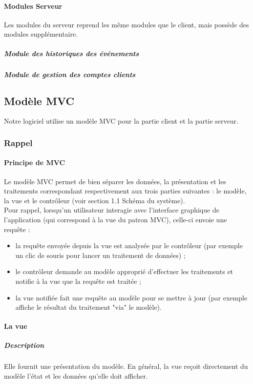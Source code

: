 \documentclass[10pt,a4paper]{report}
\begin{document}
				
			\paragraph{Modules Serveur}
				Les modules du serveur reprend les même modules que le client, mais possède des modules supplémentaire.
				
				\subparagraph{Module des historiques des événements}
	
	
				\subparagraph{Module de gestion des comptes clients}

				
	\subsection{Modèle MVC}
		Notre logiciel utilise un modèle MVC pour la partie client et la partie serveur.
		\subsubsection{Rappel}
			
			\paragraph{Principe de MVC}
			\begin{flushleft}

			Le modèle MVC permet de bien séparer les données, la présentation et les traitements correspondant respectivement aux trois parties suivantes : le modèle, la vue et le contrôleur (voir section 1.1 Schéma du système).\\
Pour rappel, lorsqu'un utilisateur interagie avec l'interface graphique de l'application (qui correspond à la vue du patron MVC), celle-ci envoie une requête  :
				\begin{itemize}
					\item la requête envoyée depuis la vue est analysée par le contrôleur (par exemple un clic de souris pour lancer un traitement de données) ;
    				\item le contrôleur demande au modèle approprié d'effectuer les traitements et notifie à la vue que la requête est traitée ;
    				\item la vue notifiée fait une requête au modèle pour se mettre à jour (par exemple affiche le résultat du traitement "via" le modèle).

				\end{itemize}
			\end{flushleft}
			
		\paragraph{La vue}
			\subparagraph{Description}
			\begin{flushleft}
				Elle fournit une présentation du modèle. En général, la vue reçoit directement du modèle l’état et les données qu’elle doit afficher.
			\end{flushleft}
			
\end{document}
